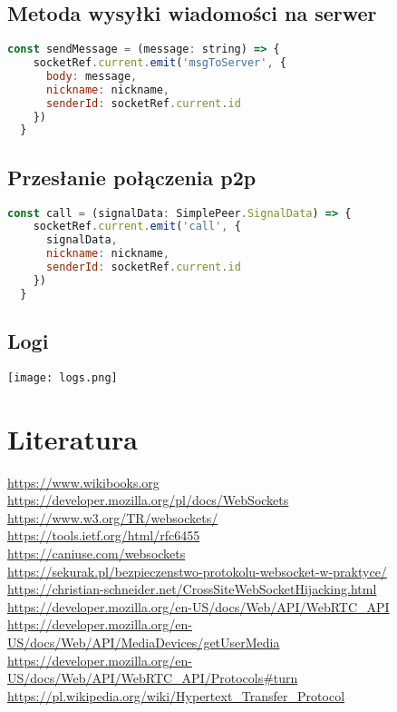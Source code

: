 \documentclass{article}
\begin{document}
\subsection{Metoda wysyłki wiadomości na serwer}
\begin{lstlisting}[language=JavaScript]
  const sendMessage = (message: string) => {
    socketRef.current.emit('msgToServer', {
      body: message,
      nickname: nickname,
      senderId: socketRef.current.id
    })
  }
\end{lstlisting}

\subsection{Przesłanie połączenia p2p}
\begin{lstlisting}[language=JavaScript]
  const call = (signalData: SimplePeer.SignalData) => {
    socketRef.current.emit('call', {
      signalData,
      nickname: nickname,
      senderId: socketRef.current.id
    })
  }
\end{lstlisting}

\subsection{Logi}
\texttt{[image: logs.png]}

\section{Literatura}

\url{https://www.wikibooks.org}\\
\url{https://developer.mozilla.org/pl/docs/WebSockets}\\
\url{https://www.w3.org/TR/websockets/}\\
\url{https://tools.ietf.org/html/rfc6455}\\
\url{https://caniuse.com/websockets}\\
\url{https://sekurak.pl/bezpieczenstwo-protokolu-websocket-w-praktyce/}\\
\url{https://christian-schneider.net/CrossSiteWebSocketHijacking.html}\\
\url{https://developer.mozilla.org/en-US/docs/Web/API/WebRTC_API}\\
\url{https://developer.mozilla.org/en-US/docs/Web/API/MediaDevices/getUserMedia}\\
\url{https://developer.mozilla.org/en-US/docs/Web/API/WebRTC_API/Protocols#turn}\\
\url{https://pl.wikipedia.org/wiki/Hypertext_Transfer_Protocol}
\end{document}
